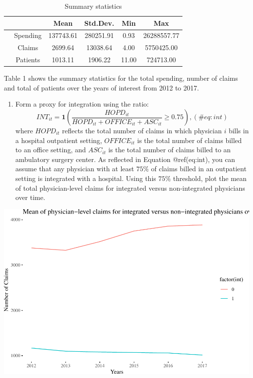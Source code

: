 \documentclass[
  12pt,
]{article}
\providecommand{\tightlist}{%
  \setlength{\itemsep}{0pt}\setlength{\parskip}{0pt}}
\begin{document}

\begin{table}[ht]
\centering
\begin{tabular}{cccccc}
  \hline
 &  & Mean & Std.Dev. & Min & Max \\ 
  \hline
 & Spending & 137743.61 & 280251.91 & 0.93 & 26288557.77 \\ 
   & Claims & 2699.64 & 13038.64 & 4.00 & 5750425.00 \\ 
   & Patients & 1013.11 & 1906.22 & 11.00 & 724713.00 \\ 
   \hline
\end{tabular}
\caption{Summary statistics} 
\label{tab:sum_stat}
\end{table}

Table 1 shows the summary statistics for the total spending, number of
claims and total of patients over the years of interest from 2012 to
2017.

\begin{enumerate}
\def\labelenumi{\arabic{enumi}.}
\setcounter{enumi}{1}
\tightlist
\item
  Form a proxy for integration using the ratio: \begin{equation}
   INT_{it} = \mathbf{1} \left(\frac{HOPD_{it}}{HOPD_{it} + OFFICE_{it} + ASC_{it}} \geq 0.75\right),
   (\#eq:int)
   \end{equation} where \(HOPD_{it}\) reflects the total number of
  claims in which physician \(i\) bills in a hospital outpatient
  setting, \(OFFICE_{it}\) is the total number of claims billed to an
  office setting, and \(ASC_{it}\) is the total number of claims billed
  to an ambulatory surgery center. As reflected in Equation
  @ref(eq:int), you can assume that any physician with at least \(75\%\)
  of claims billed in an outpatient setting is integrated with a
  hospital. Using this \(75\%\) threshold, plot the mean of total
  physician-level claims for integrated versus non-integrated physicians
  over time.
\end{enumerate}

\includegraphics{Report2_files/figure-latex/Q2, -1.pdf}
\end{document}
